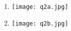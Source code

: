 \begin{question}

    \begin{enumerate}[label=\textbf{\alph*})]
        \item 
        \begin{minipage}{\textwidth}
            \centering 
            \texttt{[image: q2a.jpg]}
        \end{minipage}
        \item 
        \begin{minipage}{\textwidth}
            \centering 
            \texttt{[image: q2b.jpg]}
        \end{minipage}

    \end{enumerate}	
  
\end{question}

